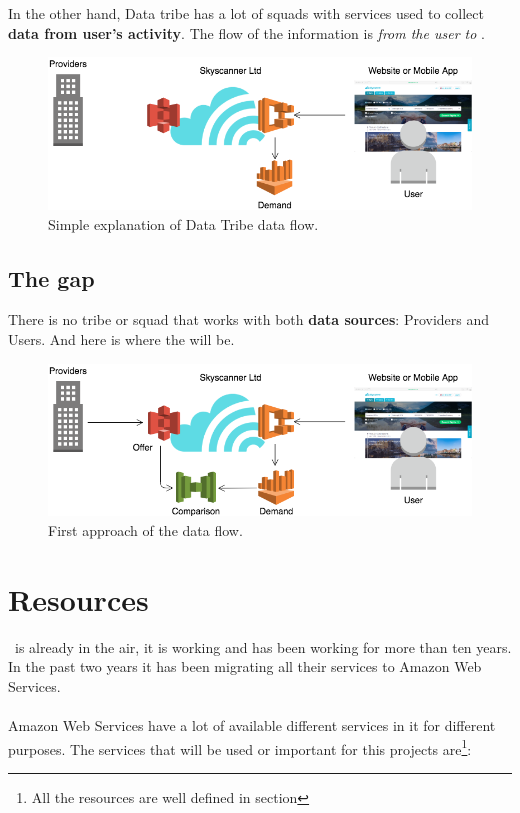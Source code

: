 In the other hand, Data tribe has a lot of squads with services used to collect \textbf{data from user's activity}. The flow of the information is \textit{from the user to \company}.

\begin{figure}[H]
\centering
\includegraphics[scale=0.45]{diagrams/state-of-the-art-tribes-data-tribe.png}
\caption{Simple explanation of Data Tribe data flow.}
\end{figure}

\subsection{The gap}

There is no tribe or squad that works with both \textbf{data sources}: Providers and Users. And here is where the \textit{\thesistitle} will be.

\begin{figure}[H]
\centering
\includegraphics[scale=0.45]{diagrams/state-of-the-art-tribes-comparison.png}
\caption{First approach of the \thesis data flow.}
\end{figure}


\section{Resources} \label{resources}

\company\ is already in the air, it is working and has been working for more than ten years. In the past two years it has been migrating all their services to Amazon Web Services\cite{aws}.
\\\\
Amazon Web Services have a lot of available different services in it for different purposes. The services that will be used or important for this projects are\footnote{All the resources are well defined in section }:

